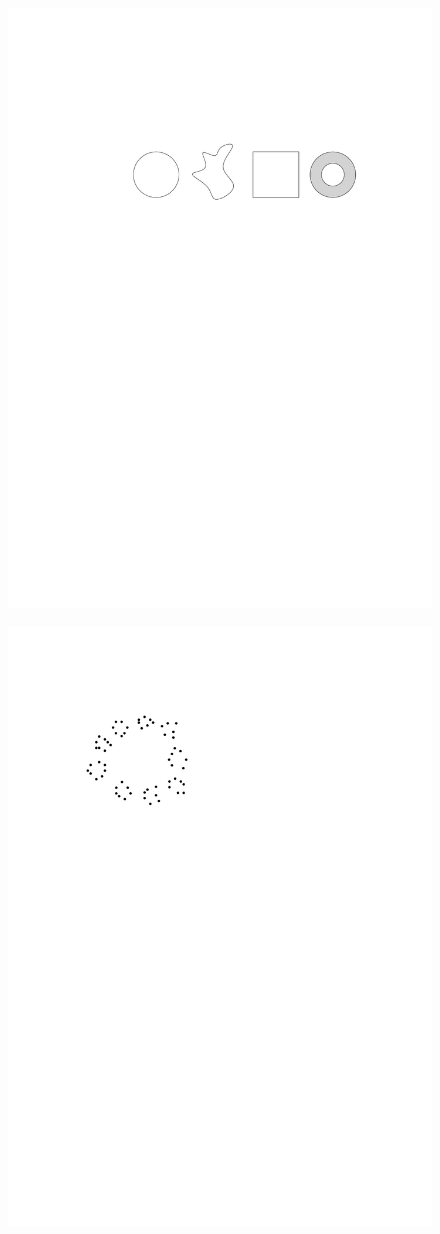 \begin{figure}
\centering
\begin{minipage}{.7\textwidth}
  \centering
  \includegraphics[width=.9\linewidth]{figures/ExampleDeformation}
  \label{fig:deform}
\end{minipage}%
\begin{minipage}{.3\textwidth}
  \centering
  \includegraphics[width=.5\linewidth]{figures/ExampleScale}

\end{minipage}
\end{figure}
